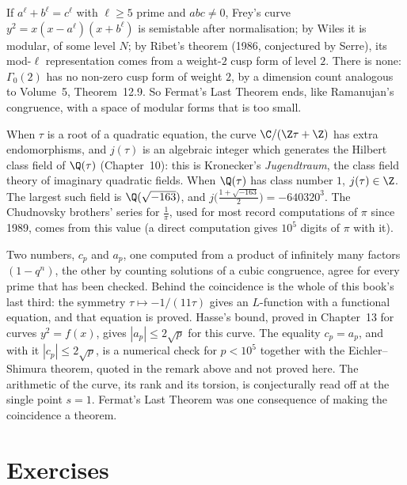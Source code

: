 \begin{remark}[Fermat]
If $a^\ell+b^\ell=c^\ell$ with $\ell\ge5$ prime and $abc\ne0$, Frey's curve $y^2=x(x-a^\ell)(x+b^\ell)$ is semistable after normalisation; by Wiles it is modular, of some level $N$;
by Ribet's theorem (1986, conjectured by Serre), its mod-$\ell$ representation comes from a weight-$2$ cusp form of level $2$. There is none: $\Gamma_0(2)$ has no non-zero cusp
form of weight $2$, by a dimension count analogous to Volume~5, Theorem~12.9. So Fermat's Last Theorem ends, like Ramanujan's congruence, with a space of modular forms
that is too small.
\end{remark}

\begin{remark}\label{rem:cm}
When $\tau$ is a root of a quadratic equation, the curve $\C/(\Z\tau+\Z)$ has extra endomorphisms, and $j(\tau)$ is an algebraic integer which generates the Hilbert
class field of $\Q(\tau)$ (Chapter~10): this is Kronecker's \emph{Jugendtraum}, the class field theory of imaginary quadratic fields. When $\Q(\tau)$ has class number $1$,
$j(\tau)\in\Z$. The largest such field is $\Q(\sqrt{-163})$, and $j\bigl(\frac{1+\sqrt{-163}}2\bigr)=-640320^3$. The Chudnovsky brothers' series for $\frac1\pi$, used for
most record computations of $\pi$ since 1989, comes from this value (a direct computation gives $10^5$ digits of $\pi$ with it).
\end{remark}

\begin{beauty}
Two numbers, $c_p$ and $a_p$, one computed from a product of infinitely many factors $(1-q^n)$, the other by counting solutions of a cubic congruence, agree for every
prime that has been checked. Behind the coincidence is the whole of this book's last third: the symmetry $\tau\mapsto-1/(11\tau)$ gives an $L$-function with a functional equation, and that equation is proved. Hasse's bound, proved in Chapter~13 for curves $y^2=f(x)$, gives $|a_p|\le2\sqrt p$ for this curve. The equality $c_p=a_p$, and with it $|c_p|\le2\sqrt p$, is a numerical check for $p<10^5$ together with the Eichler--Shimura theorem, quoted in the remark above and not proved here. The arithmetic of the curve, its rank and its torsion, is conjecturally read off at the single point
$s=1$. Fermat's Last Theorem was one consequence of making the coincidence a theorem.
\end{beauty}

\section{Exercises}

